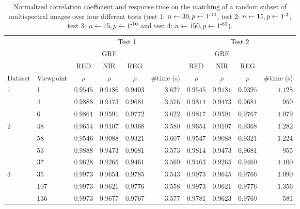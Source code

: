 \renewcommand{\arraystretch}{1.2}
\begin{table}
    \small
    \caption{Normalized correlation coefficient and response time on the matching of a random subset of multispectral images over four different tests (test 1: $n \gets 30, p \gets 1\textsuperscript{-10}$, test 2: $n \gets 15, p \gets 1\textsuperscript{-2}$, test 3: $n \gets 15, p \gets 1\textsuperscript{-10}$ and test 4: $n \gets 150, p \gets 1\textsuperscript{-60}$).}
    \label{table:multispectral_correlation_registration}
    \begin{tabular}{ll|cccr|cccr}
        \toprule
        \multicolumn{2}{c}{} & \multicolumn{4}{c}{Test 1} & \multicolumn{4}{c}{Test 2}\\
        \cmidrule{1-10}
        & & \multicolumn{3}{c}{GRE} & & \multicolumn{3}{c}{GRE} & \\
        & & RED & NIR & REG & & RED & NIR & REG\\
        Dataset & Viewpoint & $\rho$ & $\rho$ & $\rho$ & \#time (\si{\second}) & $\rho$ & $\rho$ & $\rho$ & \#time (\si{\second}) \\
        \cmidrule{1-10}
        \multirow{3}{*}{1} & 1 & $0.9545$ & $0.9186$ & $0.9403$ & $3.627$ & $0.9545$ & $0.9181$ & $0.9395$ & $1.128$\\
        & 4 & $0.9888$ & $0.9473$ & $0.9681$ & $3.576$ & $0.9814$ & $0.9473$ & $0.9681$ & $950$\\
        & 6 & $0.9861$ & $0.9591$ & $0.9772$ & $3.622$ & $0.9817$ & $0.9591$ & $0.9767$ & $1.079$\\
        \cmidrule{1-10}
        \multirow{4}{*}{2} & 48 & $0.9654$ & $0.9107$ & $0.9368$ & $3.580$ & $0.9654$ & $0.9107$ & $0.9368$ & $1.282$\\
        & 58 & $0.9546$ & $0.9088$ & $0.9321$ & $3.607$ & $0.9547$ & $0.9088$ & $0.9321$ & $1.224$\\
        & 53 & $0.9888$ & $0.9473$ & $0.9681$ & $3.573$ & $0.9814$ & $0.9473$ & $0.9681$ & $955$\\
        & 37 & $0.9628$ & $0.9265$ & $0.9461$ & $3.569$ & $0.9463$ & $0.9265$ & $0.9460$ & $1.100$\\
        \cmidrule{1-10}
        \multirow{8}{*}{3} & 35 & $0.9973$ & $0.9654$ & $0.9785$ & $3.543$ & $0.9973$ & $0.9645$ & $0.9766$ & $1.090$\\
        & 107 & $0.9973$ & $0.9621$ & $0.9776$ & $3.558$ & $0.9973$ & $0.9621$ & $0.9776$ & $1.356$\\
        & 136 & $0.9973$ & $0.9677$ & $0.9767$ & $3.577$ & $0.9781$ & $0.9623$ & $0.9760$ & $581$\\

\end{tabular}
\end{table}
